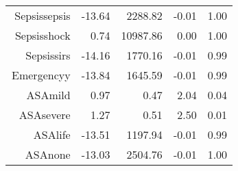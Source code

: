 \begin{tabular}{rrrrr}
$$  Sepsis\-sepsis & -13.64 & 2288.82 & -0.01 & 1.00 \\ 
  Sepsis\-shock & 0.74 & 10987.86 & 0.00 & 1.00 \\ 
  Sepsis\-sirs & -14.16 & 1770.16 & -0.01 & 0.99 \\ 
  Emergency\-y & -13.84 & 1645.59 & -0.01 & 0.99 \\ 
  ASA\-mild & 0.97 & 0.47 & 2.04 & 0.04 \\ 
  ASA\-severe & 1.27 & 0.51 & 2.50 & 0.01 \\ 
  ASA\-life & -13.51 & 1197.94 & -0.01 & 0.99 \\ 
  ASA\-none & -13.03 & 2504.76 & -0.01 & 1.00 \\ 
   \hline
\end{tabular}

